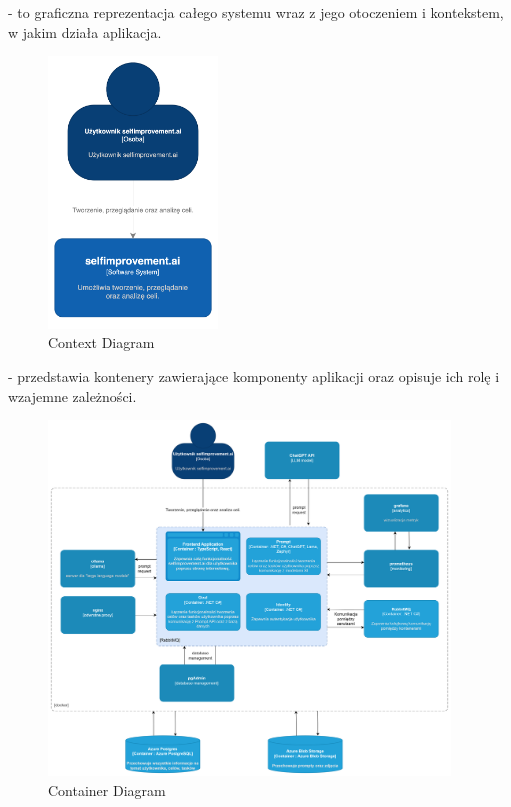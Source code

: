 \clearpage


 - to graficzna reprezentacja całego systemu wraz z jego otoczeniem i kontekstem, w jakim działa aplikacja.

\begin{figure}[H]
    \centering
    \includegraphics[width=0.4\textwidth]{Obrazy/c4_model/context_diagram.png}
    \caption{Context Diagram}
    \label{fig:my_label}
\end{figure}
\clearpage

 - przedstawia kontenery zawierające komponenty aplikacji oraz opisuje ich rolę i wzajemne zależności.

\begin{figure}[H]
    \centering
    \includegraphics[width=0.95\textwidth]{Obrazy/c4_model/container_diagram.png}
    \caption{Container Diagram}
    \label{fig:my_label}
\end{figure}
\clearpage

